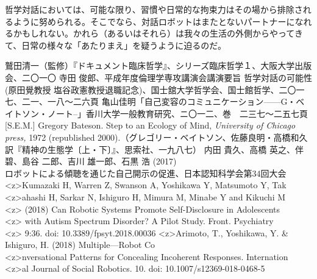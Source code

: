 \documentclass[9pt,b5j,twoside,twocolumn]{utarticle}
\begin{document}
哲学対話においては、可能な限り、習慣や日常的な拘束力はその場から排除されるように努められる。そこでなら、対話ロボットはまたとないパートナーになれるかもしれない。かれら（あるいはそれら）は我々の生活の外側からやってきて、日常の様々な「あたりまえ」を疑うように迫るのだ。


\vspace{-3mm}
\begin{thebibliography}{99}
{\small
{}鷲田清一（監修）『ドキュメント臨床哲学』、シリーズ臨床哲学１、大阪大学出版会、二〇一〇
寺田 俊郎、平成年度倫理学専攻講演会講演要旨 哲学対話の可能性 (原田覺教授 塩谷政憲教授退職記念)、国士舘大学哲学会、国士館哲学、二〇一七、二一、一八〜二六頁
亀山佳明「自己変容のコミュニケーション------G・ベイトソン・ノート--」香川大学一般教育研究、ニ〇一二、巻　二三七〜二五七頁
[S.E.M.] Gregory Bateson. Step to an Ecology of Mind, \textsl{University of Chicago press,} 1972 (republished 2000).（グレゴリー・ベイトソン、佐藤良明・高橋和久訳『精神の生態学〔上・下〕』、思索社、一九八七）
内田 貴久、高橋 英之、伴 碧、島谷 二郎、吉川 雄一郎、石黒 浩 (2017)\\ロボットによる傾聴を通じた自己開示の促進、\footnotesize 日本認知科学会第34回大会 \small
{}\pbox<z>{Kumazaki H, Warren Z, Swanson A, Yoshikawa Y, Matsumoto Y, Tak}\\\pbox<z>{ahashi H, Sarkar N, Ishiguro H, Mimura M, Minabe Y and Kikuchi M}\\\pbox<z>{ (2018) Can Robotic Systems Promote Self-Disclosure in Adolescents}\\\pbox<z>{ with Autism Spectrum Disorder? A Pilot Study. Front. Psychiatry}\\\pbox<z>{ 9:36. doi: 10.3389/fpsyt.2018.00036}
\pbox<z>{Arimoto, T., Yoshikawa, Y. \& Ishiguro, H. (2018) Multiple---Robot Co}\\\pbox<z>{nversational Patterns for Concealing Incoherent Responses. Internation}\\\pbox<z>{al Journal of Social Robotics. 10. doi: 10.1007/s12369-018-0468-5}

}
\end{thebibliography}

\end{document}
